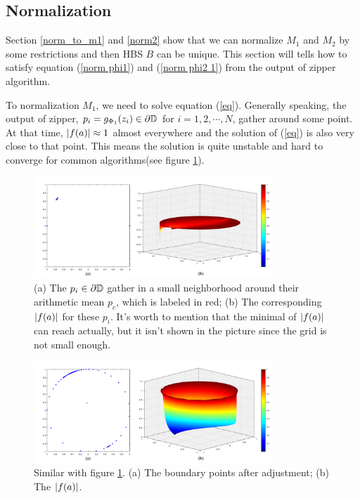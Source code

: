 \documentclass[review,onefignum,onetabnum]{siamonline190516}
\begin{document}
    \subsection{Normalization}
    Section \ref{norm_to_m1} and \ref{norm2} show that we can normalize $M_1$ and $M_2$ by some restrictions and then HBS $B$ can be unique. This section will tells how to satisfy equation (\ref{norm phi1}) and (\ref{norm phi2 1}) from the output of zipper algorithm.

    To normalization $M_1$, we need to solve equation (\ref{eq}). Generally speaking, the output of zipper, $p_i = g_{\Phi_1}(z_i) \in \partial \mathbb{D}$ for $i = 1, 2, \cdots, N$, gather around some point. At that time, $\left\vert f(a) \right\vert \approx 1$ almost everywhere and the solution of (\ref{eq}) is also very close to that point. This means the solution is quite unstable and hard to converge for common algorithms(see figure \ref{original distribution}).

    \begin{figure}
        \begin{center}
            \includegraphics[width=9cm]{fig7.png}
        \end{center}
        \caption{(a) The $p_i \in \partial \mathbb{D}$ gather in a small neighborhood around their arithmetic mean $p_c$, which is labeled in red; (b) The corresponding $\left\vert f(a) \right\vert$ for these $p_i$. It's worth to mention that the minimal of $\left\vert f(a) \right\vert$ can reach actually, but it isn't shown in the picture since the grid is not small enough.}
        \label{original distribution}
    \end{figure}

    \begin{figure}
        \begin{center}
            \includegraphics[width=9cm]{fig8.png}
        \end{center}
        \caption{Similar with figure \ref{original distribution}. (a) The boundary points after adjustment; (b) The $\left\vert f(a) \right\vert$.}
    \end{figure}
\end{document}
